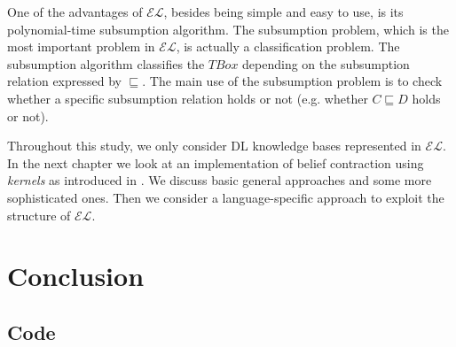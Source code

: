 \documentclass{sfuthesis}
\theoremstyle{plain}
\theoremstyle{definition}
\begin{document}
One of the advantages of $\mathcal{EL}$, besides being simple and easy to use, is its polynomial-time subsumption algorithm. The subsumption problem, which is the most important problem in $\mathcal{EL}$, is actually a classification problem. The subsumption algorithm classifies the $TBox$ depending on the subsumption relation expressed by $\sqsubseteq$. The main use of the subsumption problem is to check whether a specific subsumption relation holds or not (e.g. whether $C \sqsubseteq D$ holds or not).

Throughout this study, we only consider DL knowledge bases represented in $\mathcal{EL}$. In the next chapter we look at an implementation of belief contraction using \textit{kernels} as introduced in \cite{zwei}. We discuss basic general approaches and some more sophisticated ones. Then we consider a language-specific approach to exploit the structure of $\mathcal{EL}$. 









\chapter{Conclusion}




%
%
%
%
%

\backmatter%
	
	

\begin{appendices} %
	\chapter{Code}
\end{appendices}
\end{document}
